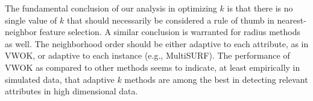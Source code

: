 \documentclass[10pt,letterpaper]{article}
\begin{document}
The fundamental conclusion of our analysis in optimizing $k$ is that there is no single value of $k$ that should necessarily be considered a rule of thumb in nearest-neighbor feature selection. A similar conclusion is warranted for radius methods as well. The neighborhood order should be either adaptive to each attribute, as in VWOK, or adaptive to each instance (e.g., MultiSURF). The performance of VWOK as compared to other methods seems to indicate, at least empirically in simulated data, that adaptive $k$ methods are among the best in detecting relevant attributes in high dimensional data.



\end{document}
